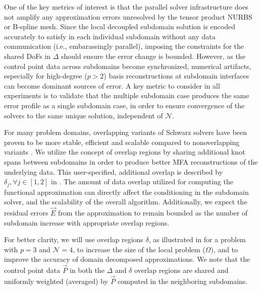 One of the key metrics of interest is that the parallel solver infrastructure does not amplify any approximation errors unresolved by the tensor product NURBS or B-spline mesh. Since the local decoupled subdomain solution is encoded accurately to satisfy  in each individual subdomain without any data communication (i.e., embarassingly parallel), imposing the constraints for the shared DoFs in $\Delta$ should ensure the error change is bounded. However, as the control point data across subdomains become synchronized, numerical artifacts, especially for high-degree ($p>2$) basis reconstructions at subdomain interfaces can become dominant sources of error. A key metric to consider in all experiments is to validate that the multiple subdomain case produces the same error profile as a single subdomain case, in order to ensure convergence of the solvers to the same unique solution, independent of $\mathcal{N}$. %


For many problem domains, overlapping variants of Schwarz solvers \cite{lions-asm, gander-rasm} have been proven to be more stable, efficient and scalable compared to nonoverlapping variants \cite{bjorstad-overlap-1989, orasm-as-ms-2007}. We utilize the concept of overlap regions by sharing additional knot spans between subdomains in order to produce better MFA reconstructions of the underlying data. This user-specified, additional overlap is described by $\delta_j, \forall j \in [1,2]$ in . The amount of data overlap utilized for computing the functional approximation can directly affect the conditioning in the subdomain solver, and the scalability of the overall algorithm. Additionally, we expect the residual errors $\vec{E}$ from the approximation to remain bounded as the number of subdomain increase with appropriate overlap regions. %

For better clarity, we will use overlap regions $\delta$, as illustrated in  for a  problem with $p=3$ and $\mathcal{N}=4$, to increase the size of the local problem ($\Omega$), and to improve the accuracy of domain decomposed approximations. We note that the control point data $\vec{P}$ in both the $\Delta$ and $\delta$ overlap regions are shared and uniformly weighted (averaged) by $\vec{P}$ computed in the neighboring subdomains.

